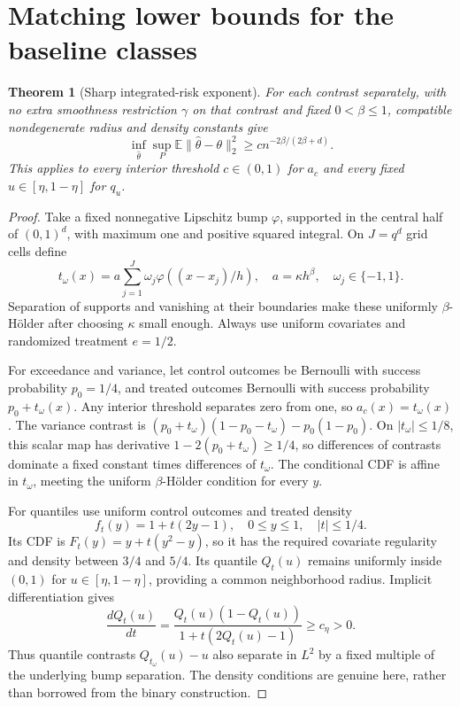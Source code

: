 \documentclass[11pt]{article}
\newtheorem{theorem}{Theorem}
\theoremstyle{remark}
\newcommand{\E}{\mathbb E}
\begin{document}
\section{Matching lower bounds for the baseline classes}
\begin{theorem}[Sharp integrated-risk exponent]\label{lower}
For each contrast separately, with no extra smoothness restriction $\gamma$ on that contrast and fixed $0<\beta\leq1$, compatible nondegenerate radius and density constants give
\[
 \inf_{\widehat\theta}\sup_P\E\|\widehat\theta-\theta\|_2^2
                       \geq c n^{-2\beta/(2\beta+d)}.
\]
This applies to every interior threshold $c\in(0,1)$ for $a_c$ and every fixed $u\in[\eta,1-\eta]$ for $q_u$.
\end{theorem}
\begin{proof}
Take a fixed nonnegative Lipschitz bump $\varphi$, supported in the central half of $(0,1)^d$, with maximum one and positive squared integral. On $J=q^d$ grid cells define
\[
 t_\omega(x)=a\sum_{j=1}^J\omega_j\varphi((x-x_j)/h),
 \quad a=\kappa h^\beta,\quad \omega_j\in\{-1,1\}.
\]
Separation of supports and vanishing at their boundaries make these uniformly $\beta$-H\"older after choosing $\kappa$ small enough. Always use uniform covariates and randomized treatment $e=1/2$.

For exceedance and variance, let control outcomes be Bernoulli with success probability $p_0=1/4$, and treated outcomes Bernoulli with success probability $p_0+t_\omega(x)$. Any interior threshold separates zero from one, so $a_c(x)=t_\omega(x)$. The variance contrast is
$(p_0+t_\omega)(1-p_0-t_\omega)-p_0(1-p_0)$. On $|t_\omega|\leq1/8$, this scalar map has derivative $1-2(p_0+t_\omega)\geq1/4$, so differences of contrasts dominate a fixed constant times differences of $t_\omega$. The conditional CDF is affine in $t_\omega$, meeting the uniform $\beta$-H\"older condition for every $y$.

For quantiles use uniform control outcomes and treated density
\[
 f_t(y)=1+t(2y-1),\quad 0\leq y\leq1,\quad |t|\leq1/4.
\]
Its CDF is $F_t(y)=y+t(y^2-y)$, so it has the required covariate regularity and density between $3/4$ and $5/4$. Its quantile $Q_t(u)$ remains uniformly inside $(0,1)$ for $u\in[\eta,1-\eta]$, providing a common neighborhood radius. Implicit differentiation gives
\[
 \frac{dQ_t(u)}{dt}
   =\frac{Q_t(u)(1-Q_t(u))}{1+t(2Q_t(u)-1)}\geq c_\eta>0.
\]
Thus quantile contrasts $Q_{t_\omega}(u)-u$ also separate in $L^2$ by a fixed multiple of the underlying bump separation. The density conditions are genuine here, rather than borrowed from the binary construction.


\end{proof}
\end{document}
